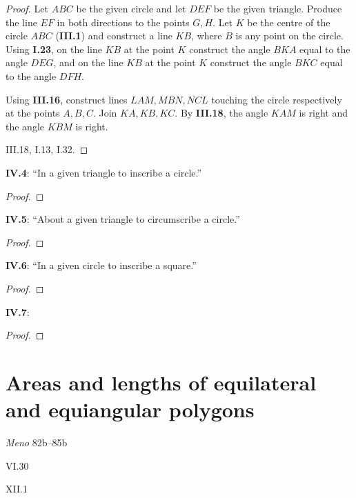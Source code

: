 \documentclass{article}
\begin{document}
\begin{proof}
Let $ABC$ be the given circle and let $DEF$ be the given triangle. Produce the line $EF$ in both directions to the points $G,H$. 
Let $K$ be the centre of the circle $ABC$ (\textbf{III.1}) and construct
a line $KB$, where $B$ is any point on the circle. Using
\textbf{I.23}, on the line $KB$ at the point $K$ construct the angle
$BKA$ equal to the angle $DEG$, and on the line 
$KB$ at the point $K$ construct the angle $BKC$ equal to the angle $DFH$.

Using \textbf{III.16}, construct lines $LAM,MBN,NCL$ touching the circle respectively at the points
$A,B,C$. Join $KA,KB,KC$. By \textbf{III.18}, the angle $KAM$ is right and the angle $KBM$ is right.






III.18, I.13, I.32.
\end{proof}

\textbf{IV.4}: ``In a given triangle to inscribe a circle.''

\begin{proof}

\end{proof}

\textbf{IV.5}: ``About a given triangle to circumscribe a circle.''

\begin{proof}

\end{proof}

\textbf{IV.6}: ``In a given circle to inscribe a square.''

\begin{proof}

\end{proof}

\textbf{IV.7}: 

\begin{proof}

\end{proof}







\section{Areas and lengths of equilateral and equiangular polygons}
{\em Meno} 82b--85b

VI.30

XII.1
\end{document}
